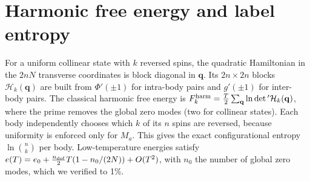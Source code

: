 \documentclass[pre,twocolumn,superscriptaddress,amsmath,amssymb,floatfix]{revtex4-2}
\begin{document}
\appendix
\section{Harmonic free energy and label entropy}\label{app:harm}

For a uniform collinear state with $k$ reversed spins, the quadratic Hamiltonian in the $2nN$ transverse coordinates is block diagonal in $\mathbf q$. Its $2n\times2n$ blocks $\mathcal H_k(\mathbf q)$ are built from $\Phi'(\pm1)$ for intra-body pairs and $g'(\pm1)$ for inter-body pairs. The classical harmonic free energy is $F_k^{\rm harm}=\tfrac{T}{2}\sum_{\mathbf q}\ln\det{}'\mathcal H_k(\mathbf q)$, where the prime removes the global zero modes (two for collinear states). Each body independently chooses which $k$ of its $n$ spins are reversed, because uniformity is enforced only for $M_a$. This gives the exact configurational entropy $\ln\binom{n}{k}$ per body. Low-temperature energies satisfy $e(T)=e_0+\tfrac{n_{\rm dof}}{2}T(1-n_0/(2N))+O(T^2)$, with $n_0$ the number of global zero modes, which we verified to 1\%.
\end{document}
